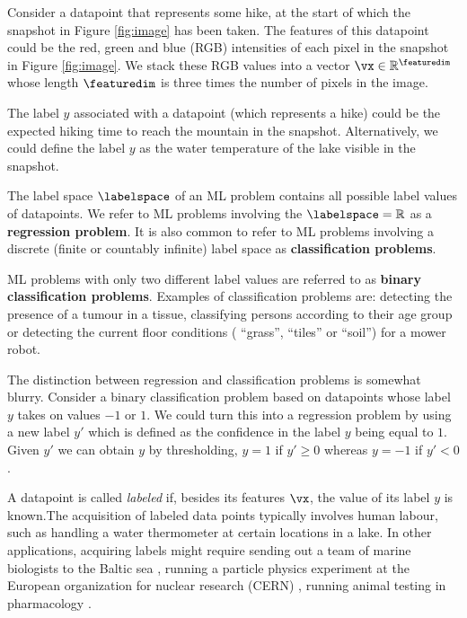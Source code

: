 \documentclass[12pt]{report}
\newcommand{\featurelen}{\featuredim}
\begin{document}
Consider a datapoint that represents some hike, at the 
start of which the snapshot in Figure \ref{fig:image} has
 been taken. The features of this datapoint could be the 
 red, green and blue (RGB) intensities of each pixel in the 
 snapshot in Figure \ref{fig:image}. We stack these RGB 
 values into a vector $\vx \in \mathbb{R}^{\featurelen}$ 
 whose length $\featurelen$ is three times the number 
 of pixels in the image. 
 
 The label $y$ associated with a datapoint (which represents 
 a hike) could be the expected hiking time to reach the mountain in the 
snapshot. Alternatively, we could define the label $y$ as 
the water temperature of the lake visible in the snapshot. 

The label space $\labelspace$ of an ML problem contains all 
possible label values of datapoints. We refer to ML problems involving 
the $\labelspace = \mathbb{R}$ as a {\bf regression problem}. 
It is also common to refer to ML problems involving a discrete 
(finite or countably infinite) label space as {\bf classification problems}. 

ML problems with only two different label values are referred to as 
{\bf binary classification problems}. Examples of classification 
problems are: detecting the presence of a tumour in a tissue, 
classifying persons according to their age group or detecting 
the current floor conditions ( ``grass'', ``tiles'' or ``soil'') for 
a mower robot. 

The distinction between regression and classification problems is 
somewhat blurry. Consider a binary classification problem based 
on datapoints whose label $y$ takes on values $-1$ or $1$. We 
could turn this into a regression problem by using a new label 
$y'$ which is defined as the confidence in the label $y$ being 
equal to $1$. Given $y'$ we can obtain $y$ by thresholding, 
$y=1$ if $y'\geq0$ whereas $y=-1$ if $y' <0$. 


A datapoint is called \emph{labeled} if, besides its features $\vx$, 
the value of its label $y$ is known.The acquisition of labeled data 
points typically involves human labour, such as handling a water 
thermometer at certain locations in a lake. In other applications, 
acquiring labels might require sending out a team of marine biologists 
to the Baltic sea \cite{MLMarineBiology}, running a particle physics 
experiment at the European organization for nuclear research (CERN) \cite{MLCERN}, 
running animal testing in pharmacology \cite{MLPharma}. 
\end{document}
